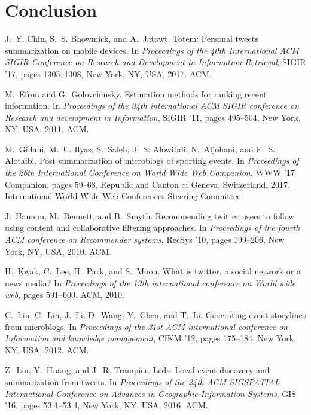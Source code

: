 \documentclass{llncs}
\begin{document}
\section{Conclusion}\label{sec:conclusion}
\begin{thebibliography}{10}

J.~Y. Chin, S.~S. Bhowmick, and A.~Jatowt.
\newblock Totem: Personal tweets summarization on mobile devices.
\newblock In {\em Proceedings of the 40th International ACM SIGIR Conference on
  Research and Development in Information Retrieval}, SIGIR '17, pages
  1305--1308, New York, NY, USA, 2017. ACM.

M.~Efron and G.~Golovchinsky.
\newblock Estimation methods for ranking recent information.
\newblock In {\em Proceedings of the 34th international ACM SIGIR conference on
  Research and development in Information}, SIGIR '11, pages 495--504, New
  York, NY, USA, 2011. ACM.

M.~Gillani, M.~U. Ilyas, S.~Saleh, J.~S. Alowibdi, N.~Aljohani, and F.~S.
  Alotaibi.
\newblock Post summarization of microblogs of sporting events.
\newblock In {\em Proceedings of the 26th International Conference on World
  Wide Web Companion}, WWW '17 Companion, pages 59--68, Republic and Canton of
  Geneva, Switzerland, 2017. International World Wide Web Conferences Steering
  Committee.

J.~Hannon, M.~Bennett, and B.~Smyth.
\newblock Recommending twitter users to follow using content and collaborative
  filtering approaches.
\newblock In {\em Proceedings of the fourth ACM conference on Recommender
  systems}, RecSys '10, pages 199--206, New York, NY, USA, 2010. ACM.

H.~Kwak, C.~Lee, H.~Park, and S.~Moon.
\newblock What is twitter, a social network or a news media?
\newblock In {\em Proceedings of the 19th international conference on World
  wide web}, pages 591--600. ACM, 2010.

C.~Lin, C.~Lin, J.~Li, D.~Wang, Y.~Chen, and T.~Li.
\newblock Generating event storylines from microblogs.
\newblock In {\em Proceedings of the 21st ACM international conference on
  Information and knowledge management}, CIKM '12, pages 175--184, New York,
  NY, USA, 2012. ACM.

Z.~Liu, Y.~Huang, and J.~R. Trampier.
\newblock Leds: Local event discovery and summarization from tweets.
\newblock In {\em Proceedings of the 24th ACM SIGSPATIAL International
  Conference on Advances in Geographic Information Systems}, GIS '16, pages
  53:1--53:4, New York, NY, USA, 2016. ACM.


\end{thebibliography}
\end{document}
